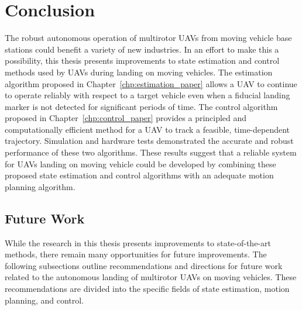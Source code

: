 
\chapter{Conclusion}
\label{chp:conclusion}

The robust autonomous operation of multirotor UAVs from moving vehicle base
stations could benefit a
variety of new industries.
In an effort to make this a possibility,
this
thesis presents improvements to state estimation and control methods used by UAVs
during landing on moving vehicles.
The estimation algorithm proposed in
Chapter~\ref{chp:estimation_paper}
allows a UAV to continue to operate reliably with respect to a target vehicle
even when a fiducial landing marker is not detected for significant
periods of time.
The control algorithm proposed in Chapter~\ref{chp:control_paper} provides a principled
and computationally efficient method for a UAV to track a feasible, time-dependent
trajectory.
Simulation and hardware tests demonstrated the accurate and robust performance
of these two algorithms.
These results suggest that a reliable system for UAVs landing
on moving vehicle could be developed by combining these proposed state
estimation and control algorithms with an adequate motion planning algorithm.

\section{Future Work}
\label{sec:future_work}
While the research in this thesis presents improvements to 
state-of-the-art methods, there remain many opportunities for future
improvements.
The following subsections outline
recommendations and directions for future work related to the autonomous
landing of multirotor UAVs on moving vehicles.
These recommendations are divided into the specific fields of state estimation,
motion planning, and control.

